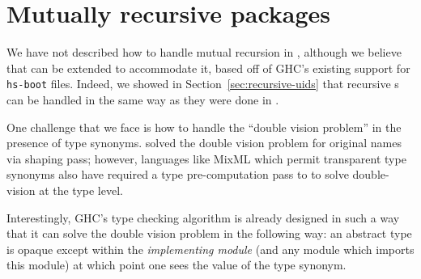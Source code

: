 



\section{Mutually recursive packages}

We have not described how to handle mutual recursion in \Backpack{},
although we believe that \Backpack{} can be extended to accommodate it,
based off of GHC's existing support for \verb|hs-boot| files.
Indeed, we showed in Section~\ref{sec:recursive-uids} that recursive
\uid{}s can be handled in the same way as they were done in \OldBackpack{}.

One challenge that we face is how to handle the ``double vision
problem'' in the presence of type synonyms.  \OldBackpack{} solved the
double vision problem for original names via  shaping pass; however,
languages like MixML which permit transparent type synonyms also have
required a type pre-computation pass to to solve double-vision at the
type level.

Interestingly, GHC's type checking algorithm is already designed in
such a way that it can solve the double vision problem in the following
way: an abstract type is opaque except within the \emph{implementing
module} (and any module which imports this module) at which point one
sees the value of the type synonym.

